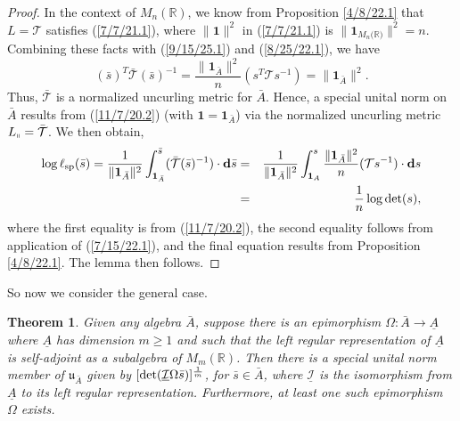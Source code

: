 \documentclass{amsart}
\newtheorem{theorem}{Theorem}
\theoremstyle{definition}
\numberwithin{theorem}{section}
\numberwithin{equation}{section}
\begin{document}
\begin{proof}
In the context of $M_n(\mathbb{R})$, we know from Proposition \ref{4/8/22.1} that $L=\mathcal{T}$ satisfies (\ref{7/7/21.1}), where $\|\mathbf{1}\|^2$ in  (\ref{7/7/21.1}) is $\|\mathbf{1}_{M_n({\mathbb{R})}}\|^2 = n$.  Combining these facts with (\ref{9/15/25.1}) and (\ref{8/25/22.1}), we have \begin{equation}\label{9/27/23.1} (\bar{s})^T \bar{\mathcal{T}} (\bar{s})^{-1} = \frac{\|\mathbf{1}_{\bar{A}}\|^2}{n}( s^T \mathcal{T} s^{-1}) = \|\mathbf{1}_{\bar{A}}\|^2 .\end{equation} 
Thus, $\mathcal{\bar{T}}$ is a normalized uncurling metric for $\bar{A}$.  Hence, a special unital norm on $\bar{A}$ results from (\ref{11/7/20.2}) (with $\mathbf{1}=\mathbf{1}_{\bar{A}}$)  via the normalized uncurling metric $L_{\shortparallel} = \bar{\mathcal{T}}$.  
  We then obtain, 
\begin{eqnarray}\nonumber \log\ell_{\rm sp}(\bar{s}) = \frac{1}{\|\mathbf{1}_{\bar{A}}\|^2} \int_{\mathbf{1}_{\bar{A}}}^{\bar{s}} (\bar{\mathcal{T}}(\bar{s})^{-1})\cdot \mathbf{d}\bar{s}
 &=& \frac{1}{\|\mathbf{1}_{\bar{A}}\|^2} \int_{\mathbf{1}_{A}}^{s} \frac{\|\mathbf{1}_{\bar{A}}\|^2}{n}(\mathcal{T}s^{-1})\cdot \mathbf{d}s \\ &=& \frac{1}{n} \log\text{det}(s),\label{9/27/23.2}\end{eqnarray} where the first equality is from (\ref{11/7/20.2}), the second equality follows from application of (\ref{7/15/22.1}), and the final equation results from Proposition \ref{4/8/22.1}.
The lemma then follows. 
 \end{proof} 
 

So now we consider the general case.
 
  \begin{theorem}\label{11/17/22.1}
  Given any algebra $\bar{A}$, suppose there is an epimorphism $\Omega:\bar{A}\rightarrow \underline{A}$ where $ \underline{A}$ has dimension $m\ge 1$ and such that the left regular representation of $\underline{A}$ is self-adjoint as a subalgebra of $M_m(\mathbb{R})$.  Then there is a special unital norm member of $\mathfrak{u}_{\bar{A}}$ given by $[{\rm det}(\underline{\mathcal{I}}\Omega \bar{s})]^{\frac{1}{m}}$, for $\bar{s}\in\bar{A}$, where $\underline{\mathcal{I}}$ is the isomorphism from $\underline{A}$ to its left regular representation.  Furthermore, at least one such epimorphism $\Omega$ exists. 
   \end{theorem}
 
\end{document}
